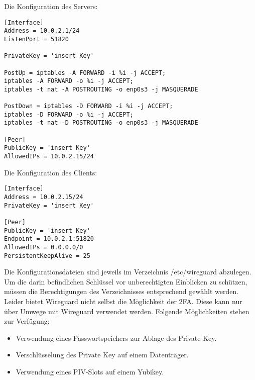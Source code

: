 \noindent Die Konfiguration des Servers:
\begin{verbatim}
[Interface]
Address = 10.0.2.1/24
ListenPort = 51820

PrivateKey = 'insert Key'

PostUp = iptables -A FORWARD -i %i -j ACCEPT; 
iptables -A FORWARD -o %i -j ACCEPT; 
iptables -t nat -A POSTROUTING -o enp0s3 -j MASQUERADE

PostDown = iptables -D FORWARD -i %i -j ACCEPT; 
iptables -D FORWARD -o %i -j ACCEPT; 
iptables -t nat -D POSTROUTING -o enp0s3 -j MASQUERADE

[Peer]  
PublicKey = 'insert Key'
AllowedIPs = 10.0.2.15/24
\end{verbatim}
\vspace{0.5cm}
\noindent Die Konfiguration des Clients:
\begin{verbatim}
[Interface]
Address = 10.0.2.15/24
PrivateKey = 'insert Key'

[Peer]  
PublicKey = 'insert Key'
Endpoint = 10.0.2.1:51820
AllowedIPs = 0.0.0.0/0
PersistentKeepAlive = 25
\end{verbatim}

\noindent Die Konfigurationsdateien sind jeweils im Verzeichnis /etc/wireguard abzulegen. Um die darin befindlichen Schl\"ussel vor unberechtigten Einblicken zu sch\"utzen, m\"ussen die Berechtigungen des Verzeichnisses entsprechend gew\"ahlt werden. \\

\noindent Leider bietet Wireguard nicht selbst die M\"oglichkeit der \ac{2FA}. Diese kann nur \"uber Umwege mit Wireguard verwendet werden. Folgende M\"oglichkeiten stehen zur Verf\"ugung:
   \begin{itemize}
      \item Verwendung eines Passwortspeichers zur Ablage des Private Key.
      \item Verschl\"usselung des Private Key auf einem Datentr\"ager.
			\item Verwendung eines PIV-Slots auf einem Yubikey.
   \end{itemize}

